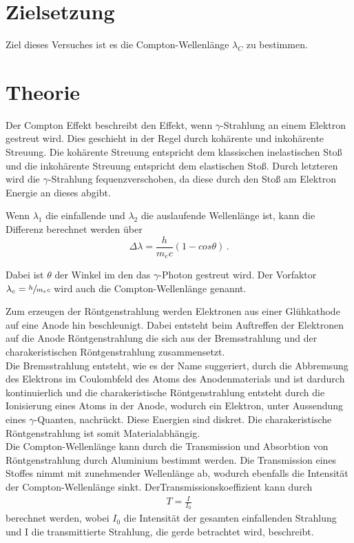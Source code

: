 \section{Zielsetzung}
Ziel dieses Versuches ist es die Compton-Wellenlänge $\lambda_C$ zu bestimmen.

\section{Theorie}
Der Compton Effekt beschreibt den Effekt, wenn $\gamma$-Strahlung an einem Elektron gestreut wird. Dies geschieht in der Regel durch kohärente und inkohärente Streuung. 
Die kohärente Streuung entspricht dem klassischen inelastischen Stoß und die inkohärente Streuung entspricht dem elastischen Stoß. Durch letzteren wird die $\gamma$-Strahlung
fequenzverschoben, da diese durch den Stoß am Elektron Energie an dieses abgibt. 

\noindent
Wenn $\lambda_1$ die einfallende und $\lambda_2$ die auslaufende Wellenlänge ist, kann die Differenz berechnet werden über
\begin{equation}
    \Delta \lambda = \frac{h}{m_ec} \left(1 - cos \theta \right) \, .
    \label{eqn:lambda}
\end{equation}

\noindent
Dabei ist $\theta$ der Winkel im den das $\gamma$-Photon gestreut wird. Der Vorfaktor $\lambda_c = \sfrac{h}{m_ec}$ wird auch die Compton-Wellenlänge genannt. 

\noindent
Zum erzeugen der Röntgenstrahlung werden Elektronen aus einer Glühkathode auf eine Anode hin beschleunigt. Dabei entsteht beim Auftreffen der Elektronen auf die Anode
Röntgenstrahlung die sich aus der Bremsstrahlung und der charakeristischen Röntgenstrahlung zusammensetzt. \\
Die Bremsstrahlung entsteht, wie es der Name suggeriert, durch die Abbremsung des Elektrons im Coulombfeld des Atoms des Anodenmaterials und ist dardurch kontinuierlich 
und die charakeristische Röntgenstrahlung entsteht durch die Ionisierung eines Atoms in der Anode, wodurch ein Elektron, unter Aussendung eines $\gamma$-Quanten, nachrückt. Diese
Energien sind diskret. Die charakeristische Röntgenstrahlung ist somit Materialabhängig. \\
\noindent
Die Compton-Wellenlänge kann durch die Transmission und Absorbtion von Röntgenstrahlung durch Aluminium bestimmt werden. Die Transmission eines Stoffes nimmt mit zunehmender Wellenlänge
ab, wodurch ebenfalls die Intensität der Compton-Wellenlänge sinkt. 
DerTransmissionskoeffizient kann durch
\begin{align}
    T=\frac{I}{I_0} \label{eq:3}
\end{align}
berechnet werden, wobei $I_0$ die Intensität der gesamten einfallenden Strahlung und I die transmittierte Strahlung, die gerde betrachtet wird, beschreibt.\\

